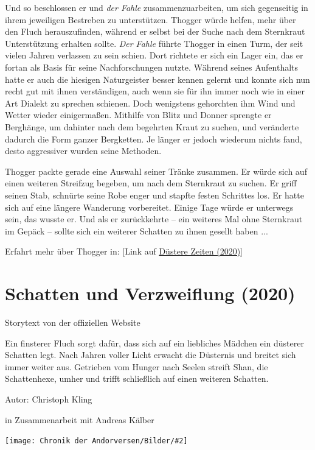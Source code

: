 \documentclass[10pt, a4paper, oneside]{book}
\newcommand{\fillbreak}{\vspace*{\fill}\columnbreak}
\newcommand{\storytext}[1]{%
    \section{#1}%
    \label{Storytext: #1}%
}
\newcommand{\refprodukt}[1]{\hyperref[Produkt: #1]{#1}}
\newcommand{\bildmitts}[2][height=0.32\textwidth,width=0.48\textwidth,keepaspectratio]{%
    \begin{center}
        \texttt{[image: Chronik der Andorversen/Bilder/\#2]}
    \end{center}
}
\begin{document}
\begin{multicols}{2}
Und so beschlossen er und \textit{der Fahle} zusammenzuarbeiten, um sich gegenseitig in ihrem jeweiligen Bestreben zu unterstützen. Thogger würde helfen, mehr über den Fluch herauszufinden, während er selbst bei der Suche nach dem Sternkraut Unterstützung erhalten sollte. \textit{Der Fahle} führte Thogger in einen Turm, der seit vielen Jahren verlassen zu sein schien. Dort richtete er sich ein Lager ein, das er fortan als Basis für seine Nachforschungen nutzte. Während seines Aufenthalts hatte er auch die hiesigen Naturgeister besser kennen gelernt und konnte sich nun recht gut mit ihnen verständigen, auch wenn sie für ihn immer noch wie in einer Art Dialekt zu sprechen schienen. Doch wenigstens gehorchten ihm Wind und Wetter wieder einigermaßen. Mithilfe von Blitz und Donner sprengte er Berghänge, um dahinter nach dem begehrten Kraut zu suchen, und veränderte dadurch die Form ganzer Bergketten. Je länger er jedoch wiederum nichts fand, desto aggressiver wurden seine Methoden.\bigskip

Thogger packte gerade eine Auswahl seiner Tränke zusammen. Er würde sich auf einen weiteren Streifzug begeben, um nach dem Sternkraut zu suchen. Er griff seinen Stab, schnürte seine Robe enger und stapfte festen Schrittes los. Er hatte sich auf eine längere Wanderung vorbereitet. Einige Tage würde er unterwegs sein, das wusste er. Und als er zurückkehrte – ein weiteres Mal ohne Sternkraut im Gepäck – sollte sich ein weiterer Schatten zu ihnen gesellt haben ...\bigskip

Erfahrt mehr über Thogger in: [Link auf \refprodukt{Düstere Zeiten (2020)}]




\fillbreak
\storytext{Schatten und Verzweiflung (2020)}


\begin{center}
    Storytext von der offiziellen Website
\end{center}

Ein finsterer Fluch sorgt dafür, dass sich auf ein liebliches Mädchen ein düsterer Schatten legt. Nach Jahren voller Licht erwacht die Düsternis und breitet sich immer weiter aus. Getrieben vom Hunger nach Seelen streift Shan, die Schattenhexe, umher und trifft schließlich auf einen weiteren Schatten.\bigskip

Autor: Christoph Kling

in Zusammenarbeit mit Andreas Kälber\bigskip


\bildmitts{Schatten und Verzweiflung Bild 1.jpg}



\end{multicols}
\end{document}
